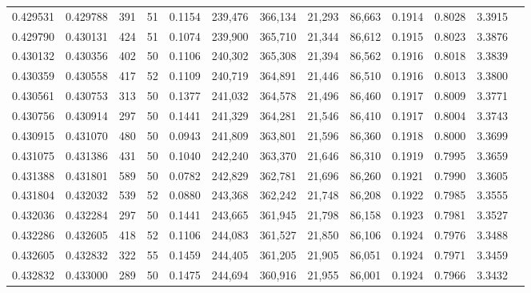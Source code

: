 \begin{tabular}{rrrrrrrrrrrrr}
0.429531 & 0.429788 &   391 &  51 &                                     0.1154 & 239,476 & 366,134 &  21,293 &  86,663 & 0.1914 & 0.8028 & 3.3915 \\
0.429790 & 0.430131 &   424 &  51 &                                     0.1074 & 239,900 & 365,710 &  21,344 &  86,612 & 0.1915 & 0.8023 & 3.3876 \\
0.430132 & 0.430356 &   402 &  50 &                                     0.1106 & 240,302 & 365,308 &  21,394 &  86,562 & 0.1916 & 0.8018 & 3.3839 \\
0.430359 & 0.430558 &   417 &  52 &                                     0.1109 & 240,719 & 364,891 &  21,446 &  86,510 & 0.1916 & 0.8013 & 3.3800 \\
0.430561 & 0.430753 &   313 &  50 &                                     0.1377 & 241,032 & 364,578 &  21,496 &  86,460 & 0.1917 & 0.8009 & 3.3771 \\
0.430756 & 0.430914 &   297 &  50 &                                     0.1441 & 241,329 & 364,281 &  21,546 &  86,410 & 0.1917 & 0.8004 & 3.3743 \\
0.430915 & 0.431070 &   480 &  50 &                                     0.0943 & 241,809 & 363,801 &  21,596 &  86,360 & 0.1918 & 0.8000 & 3.3699 \\
0.431075 & 0.431386 &   431 &  50 &                                     0.1040 & 242,240 & 363,370 &  21,646 &  86,310 & 0.1919 & 0.7995 & 3.3659 \\
0.431388 & 0.431801 &   589 &  50 &                                     0.0782 & 242,829 & 362,781 &  21,696 &  86,260 & 0.1921 & 0.7990 & 3.3605 \\
0.431804 & 0.432032 &   539 &  52 &                                     0.0880 & 243,368 & 362,242 &  21,748 &  86,208 & 0.1922 & 0.7985 & 3.3555 \\
0.432036 & 0.432284 &   297 &  50 &                                     0.1441 & 243,665 & 361,945 &  21,798 &  86,158 & 0.1923 & 0.7981 & 3.3527 \\
0.432286 & 0.432605 &   418 &  52 &                                     0.1106 & 244,083 & 361,527 &  21,850 &  86,106 & 0.1924 & 0.7976 & 3.3488 \\
0.432605 & 0.432832 &   322 &  55 &                                     0.1459 & 244,405 & 361,205 &  21,905 &  86,051 & 0.1924 & 0.7971 & 3.3459 \\
0.432832 & 0.433000 &   289 &  50 &                                     0.1475 & 244,694 & 360,916 &  21,955 &  86,001 & 0.1924 & 0.7966 & 3.3432 \\

\end{tabular}
